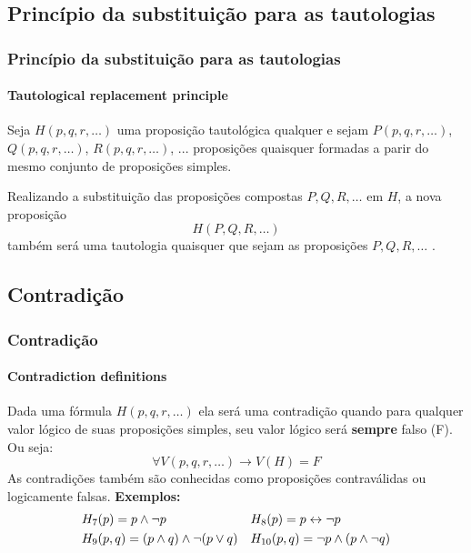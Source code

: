 \subsection{Princípio da substituição para as tautologias}
%
\begin{frame}[t]
    \frametitle{Princípio da substituição para as tautologias}
    \framesubtitle{Tautological replacement principle}
    \begin{tcolorbox}[colback=blue!5,colframe=blue!60!black,adjusted title=Definição]
        \indent Seja $H(p,q,r,\dots)$ uma proposição tautológica qualquer e sejam $P(p,q,r,\dots)$, $Q(p,q,r,\dots)$, $R(p,q,r,\dots)$, ... proposições quaisquer formadas a parir do mesmo conjunto de proposições simples.
        
        \tcblower
        
        Realizando a substituição das proposições compostas $P, Q, R, \dots$ em $H$, a nova proposição $$ H(P,Q,R,\dots)$$ também será uma tautologia quaisquer que sejam as proposições $P, Q, R, \dots$ .
    \end{tcolorbox}
\end{frame}
%
\subsection{Contradição}
%
\begin{frame}[t]
    \frametitle{Contradição}
    \framesubtitle{Contradiction definitions}
    \begin{tcolorbox}[colback=red!5!white,colframe=red!75!black,title=Definição]
        Dada uma fórmula $H(p,q,r,\dots)$ ela será uma contradição quando para qualquer valor lógico de suas proposições simples, seu valor lógico será \textbf{sempre} falso (F). Ou seja:
        $$ \forall V(p,q,r,\dots) \to V(H)=F$$
        As contradições também são conhecidas como proposições contraválidas ou logicamente falsas.
        \tcblower
        \textbf{Exemplos:}
        \vspace{-5pt}
        \begin{align*}
            &H_7(p) = p \land \lnot p                     &        & H_8(p) = p \leftrightarrow \lnot p \\
            &H_9(p,q) = (p \land q) \land \lnot (p \lor q)    &        & H_{10}(p,q) = \lnot p \land (p \land \lnot q)
        \end{align*}
    \end{tcolorbox}
\end{frame}
%
